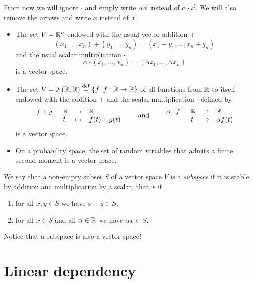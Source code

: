 \documentclass[11pt,nocut]{article}
\begin{document}
From now we will ignore $\cdot$ and simply write $\alpha \vec{x}$ instead of $\alpha \cdot \vec{x}$. We will also remove the arrows and write $x$ instead of $\vec{x}$.

\begin{example}
	\leavevmode
	\begin{itemize}
		\item The set $V = \mathbb{R}^n$ endowed with the usual vector addition $+$
			$$
			(x_1, \dots, x_n) + (y_1, \dots, y_n) = (x_1 + y_1, \dots, x_n + y_n)
			$$
			and the usual scalar multiplication $\cdot$
			$$
			\alpha \cdot (x_1, \dots, x_n)= (\alpha x_1, \dots, \alpha x_n)
			$$
			is a vector space.
		\item The set $V = \mathcal{F}(\mathbb{R},\mathbb{R}) \overset{\rm def}{=} \{ f \, | \, f: \mathbb{R} \to \mathbb{R} \}$ of all functions from $\mathbb{R}$ to itself endowed with the addition $+$ and the scalar multiplication $\cdot$ defined by
			$$
			\begin{array}{rlll}
				f+g :& \mathbb{R} & \to & \mathbb{R} \\
					 &t & \mapsto & f(t) + g(t)
			\end{array}
			\qquad
			\text{and}
			\qquad
			\begin{array}{rlll}
				\alpha \cdot f :& \mathbb{R} & \to & \mathbb{R} \\
								&t & \mapsto & \alpha f(t)
			\end{array}
			$$
			is a vector space.
		\item On a probability space, the set of random variables that admits a finite second moment is a vector space.
	\end{itemize}
\end{example}

\begin{definition}[Subspace]
	We say that a non-empty subset $S$ of a vector space $V$ is a \emph{subspace} if it is stable by addition and multiplication by a scalar, that is if
	\begin{enumerate}[label=(\roman*),noitemsep]
		\item for all $x,y \in S$ we have $x + y \in S$,
		\item for all $x \in S$ and all $\alpha \in \mathbb{R}$ we have $\alpha x \in S$.
	\end{enumerate}
\end{definition}

Notice that a subspace is also a vector space!

\section{Linear dependency}
\end{document}
